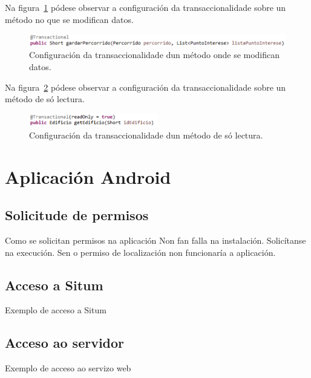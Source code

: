 Na figura~\ref{fig:metodoTransaccional} pódese observar a configuración da transaccionalidade sobre un método no que se modifican datos.

\begin{figure}[tbh] 
	\begin{center}
		\includegraphics[width=1\textwidth]{figures/codigo/metodoTransaccional}
		\caption{Configuración da transaccionalidade dun método onde se modifican datos.}
		\label{fig:metodoTransaccional}
	\end{center}
\end{figure}

Na figura~\ref{fig:metodoNonTransaccional} pódese observar a configuración da transaccionalidade sobre un método de só lectura.

\begin{figure}[tbh] 
	\begin{center}
		\includegraphics[width=0.5\textwidth]{figures/codigo/metodoNonTransaccional}
		\caption{Configuración da transaccionalidade dun método de só lectura.}
		\label{fig:metodoNonTransaccional}
	\end{center}
\end{figure}


\section{Aplicación Android}

\subsection{Solicitude de permisos}
Como se solicitan permisos na aplicación
Non fan falla na instalación. Solicítanse na execución. Sen o permiso de localización non funcionaría a aplicación.

\subsection{Acceso a Situm}
Exemplo de acceso a Situm

\subsection{Acceso ao servidor}
Exemplo de acceso ao servizo web




